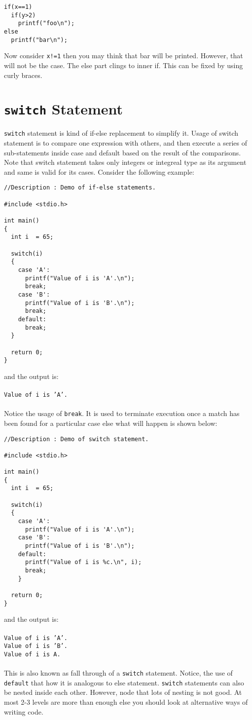 \begin{verbatim}
if(x==1)
  if(y>2)
    printf("foo\n");
else
  printf("bar\n");
\end{verbatim}

Now consider \texttt{x!=1} then you may think that bar will be
printed. However, that will not be the case. The else part clings to inner
if. This can be fixed by using curly braces.

\section{\texttt{switch} Statement}
\texttt{switch} statement is kind of if-else replacement to simplify it. Usage
of switch statement is to compare one expression with others, and then execute
a series of sub-statements inside case and default based on the result of the
comparisons. Note that switch statement takes only integers or integreal type
as its argument and same is valid for its cases. Consider the following
example:

\begin{verbatim}
//Description : Demo of if-else statements.

#include <stdio.h>

int main()
{
  int i  = 65;

  switch(i)
  {
    case 'A':
      printf("Value of i is 'A'.\n");
      break;
    case 'B':
      printf("Value of i is 'B'.\n");
      break;
    default:
      break;
  }

  return 0;
}
\end{verbatim}
and the output is:
\\\\\texttt{Value of i is 'A'.\\\\}
Notice the usage of \texttt{break}. It is used to terminate execution once a
match has been found for a particular case else what will happen is shown
below:

\begin{verbatim}
//Description : Demo of switch statement.

#include <stdio.h>

int main()
{
  int i  = 65;

  switch(i)
  {
    case 'A':
      printf("Value of i is 'A'.\n");
    case 'B':
      printf("Value of i is 'B'.\n");
    default:
      printf("Value of i is %c.\n", i);
      break;
    }

  return 0;
}
\end{verbatim}
and the output is:
\\\\\texttt{Value of i is 'A'.\\
Value of i is 'B'.\\
Value of i is A.\\\\}
This is also known as fall through of a \texttt{switch} statement. Notice, the
use of \texttt{default} that how it is analogous to else
statement. \texttt{switch} statements can also be nested inside each
other. However, node that lots of nesting is not good. At 
most 2-3 levels are more than enough else you should look at alternative ways
of writing code.

